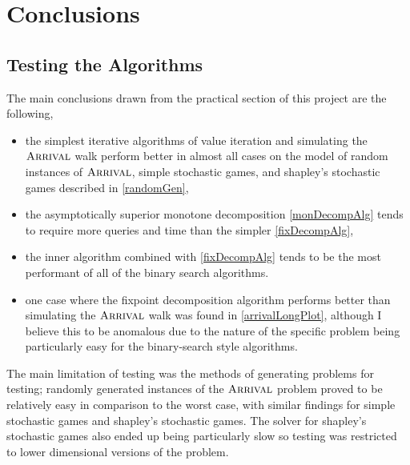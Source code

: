 \chapter{Conclusions}
\section{Testing the Algorithms}
The main conclusions drawn from the practical section of this project
are the following,
\begin{itemize}
  \item the simplest iterative algorithms of value iteration and simulating the $\textsc{Arrival}$ walk
    perform better in almost all cases on the model of random instances of $\textsc{Arrival}$, simple stochastic games,
    and shapley's stochastic games described in \cref{randomGen},
  \item the asymptotically superior monotone decomposition \cref{monDecompAlg} tends
    to require more queries and time than the simpler \cref{fixDecompAlg},
  \item the inner algorithm combined with \cref{fixDecompAlg} tends to be the most performant
    of all of the binary search algorithms.
  \item one case where the fixpoint decomposition algorithm performs better than
    simulating the $\textsc{Arrival}$ walk was found in \cref{arrivalLongPlot}, although I believe
    this to be anomalous due to the nature of the specific problem being particularly
    easy for the binary-search style algorithms.
\end{itemize}
The main limitation of testing was the methods of generating problems for testing;
randomly generated instances of the $\textsc{Arrival}$ problem proved to be relatively easy
in comparison to the worst case, with similar findings for simple stochastic games
and shapley's stochastic games. The solver for shapley's stochastic games also
ended up being particularly slow so testing was restricted to lower dimensional versions of the problem.

